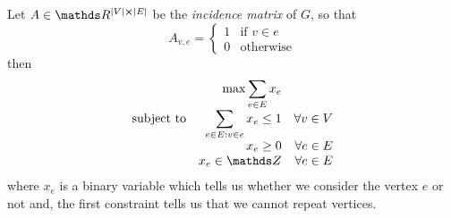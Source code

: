 \documentclass[12pt]{extarticle}
\begin{document}
Let $A \in \R^{\abs{V} \cross \abs{E}}$ be the \emph{incidence matrix} of $G$, so that
\begin{equation}
	A_{v, e} = \begin{cases}
		1 & \text{if } v \in e \\
		0 & \text{otherwise}
	\end{cases}
\end{equation}
then
\begin{equation}
	\begin{array}{lrr}
		                  & \displaystyle \max \sum_{e \in E} x_e             &                 \\
		\text{subject to} & \displaystyle \sum_{e \in E : v \in e} x_e \leq 1 & \forall v \in V \\
		                  & x_e \geq 0                                        & \forall e \in E \\
		                  & x_e \in \Z                                        & \forall e \in E
	\end{array}
	\label{eq:ilp-max-cardinality}
\end{equation}
where $x_e$ is a binary variable which tells us whether we consider the vertex $e$ or not and,
the first constraint tells us that we cannot repeat vertices.
\end{document}
